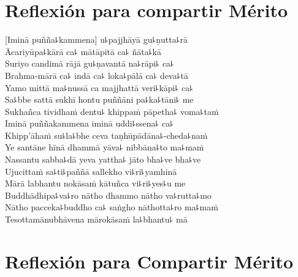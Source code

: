 \chapter*[Compartir Mérito]{Reflexión para compartir Mérito}

\delegateSetUseNext

\begin{leader}
\end{leader}


[Iminā puñña꜕kammena] u꜕pajjhāyā gu꜕ṇutta꜕rā\\
Ācariyūpa꜕kārā ca꜕ mātāpitā ca꜕ ñāta꜕kā\\
Suriyo candimā rājā gu꜕ṇavantā na꜕rāpi꜕ ca꜕\\
Brahma-mārā ca꜕ indā ca꜕ loka꜕pālā ca꜕ deva꜕tā\\
Yamo mittā ma꜕nussā ca majjhattā veri꜕kāpi꜕ ca꜕\\
Sa꜕bbe sattā sukhī hontu puññāni pa꜕ka꜕tāni꜕ me\\
Sukhañca tividhaṁ dentu꜕ khippaṁ pāpetha꜕ voma꜕taṁ\\
Iminā puññakammena iminā uddi꜕ssena꜕ ca꜕\\
Khipp'āhaṁ su꜕la꜕bhe ceva taṇhūpādāna꜕-cheda꜕naṁ\\
Ye santāne hīnā dhammā yāva꜕ nibbāna꜕to ma꜕maṁ\\
Nassantu sabba꜕dā yeva yattha꜕ jāto bha꜕ve bha꜕ve\\
Ujucittaṁ sa꜕ti꜕paññā sallekho vi꜕ri꜕yamhinā\\
Mārā labhantu nokāsaṁ kātuñca vi꜕ri꜕yes꜕u me\\
Buddhādhipa꜕va꜕ro nātho dhammo nātho va꜕rutta꜕mo\\
Nātho pacceka꜕buddho ca꜕ saṅgho nāthotta꜕ro ma꜕maṁ\\
Tesottamānubhāvena mārokāsaṁ la꜕bhantu꜕ mā

\chapter[Compartir Mérito]{Reflexión para Compartir Mérito}

\enlargethispage{2\baselineskip}

\begin{leader}
\end{leader}


